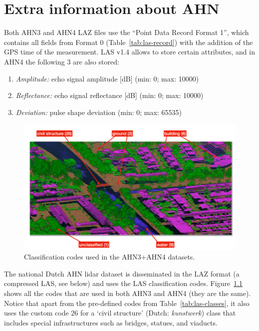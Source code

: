
\graphicspath{{appendices/ahn/figs/}}

\chapter{Extra information about AHN}%
\label{app:ahn}



Both AHN3 and AHN4 LAZ files use the ``Point Data Record Format 1'', which contains all fields from Format 0 (Table~\ref{tab:las-record}) with the addition of the GPS time of the measurement.
LAS v1.4 allows to store certain attributes, and in AHN4 the following 3 are also stored:
\begin{enumerate}
  \item \emph{Amplitude:} echo signal amplitude [dB] (min: 0; max: 10000) 
  \item \emph{Reflectance:} echo signal reflectance [dB] (min: 0; max: 10000)
  \item \emph{Deviation:} pulse shape deviation (min: 0; max: 65535)
\end{enumerate}

%

\begin{figure}
  \includegraphics[width=\linewidth]{ahn4.png}
  \caption{Classification codes used in the AHN3+AHN4 datasets.}%
\label{fig:ahn3}
\end{figure}
The national Dutch AHN lidar dataset 
is disseminated in the LAZ format (a compressed LAS, see below) and uses the LAS classification codes. 
Figure~\ref{fig:ahn3} shows all the codes that are used in both AHN3 and AHN4 (they are the same). 
Notice that apart from the pre-defined codes from Table~\ref{tab:las-classes}, it also uses the custom code $26$ for a `civil structure' (Dutch: \emph{kunstwerk}) class that includes special infrastructures such as bridges, statues, and viaducts. 

